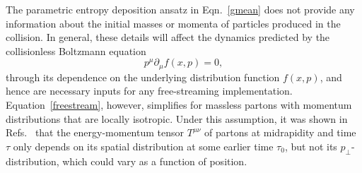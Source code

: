 \documentclass[aps,prc,reprint,amsmath,nofootinbib]{revtex4-1}
\begin{document}
The parametric entropy deposition ansatz in Eqn.~\eqref{gmean} does not provide any information about the initial masses or momenta of particles produced in the collision.
In general, these details will affect the dynamics predicted by the collisionless Boltzmann equation
\begin{equation}
  \label{freestream}
  p^\mu \partial_\mu f(x, p) = 0,
\end{equation}
through its dependence on the underlying distribution function $f(x, p)$, and hence are necessary inputs for any free-streaming implementation.
Equation~\eqref{freestream}, however, simplifies for massless partons with momentum distributions that are locally isotropic.
Under this assumption, it was shown in Refs.~\cite{Broniowski:2008qk, Liu:2015nwa} that the energy-momentum tensor $T^{\mu\nu}$ of partons at midrapidity and time $\tau$ only depends on its spatial distribution at some earlier time $\tau_0$, but not its $p_\perp$-distribution, which could vary as a function of position.
\end{document}
